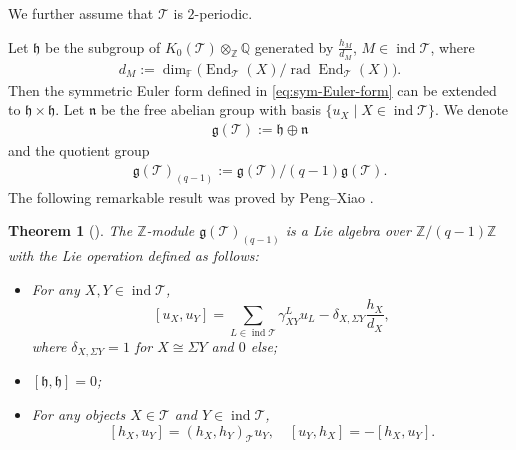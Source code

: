\documentclass[12pt,reqno]{amsart}
\numberwithin{equation}{section}
\newcommand{\rad}{\operatorname{rad}\nolimits}
\newcommand{\End}{\operatorname{End}\nolimits}
\renewcommand{\dim}{\operatorname{dim}\nolimits}
\newcommand{\go}{{K_0}}
\newtheorem{theorem}{Theorem}[section]
\begin{document}
	We further assume that $\mathcal{T}$ is $2$-periodic.
	
	
	Let $\mathfrak{h}$ be the subgroup of $\go(\mathcal{T})\otimes_{\mathbb{Z}}\mathbb{Q}$ generated by $\frac{h_M}{d_M}$, $M\in \operatorname{ind} \mathcal{T}$, where 
	\begin{align}
		d_M:=\dim_{\mathbb{F}}\big(\End_{\mathcal{T}}(X)/\rad \End_{\mathcal{T}} (X)\big).
	\end{align} 
	Then the symmetric Euler form defined in \eqref{eq:sym-Euler-form} can be extended to $\mathfrak{h}\times \mathfrak{h}$. Let $\mathfrak{n}$ be the free abelian group with basis $\{ u_X\mid X\in \operatorname{ind} \mathcal{T}\}$. We denote
	\begin{align}
		\mathfrak{g}(\mathcal{T}):=\mathfrak{h} \oplus \mathfrak{n}
	\end{align}
	and  the quotient group
	\begin{align}
		\mathfrak{g}(\mathcal{T})_{(q-1)}:=\mathfrak{g}(\mathcal{T}) /(q-1) \mathfrak{g}(\mathcal{T}).
	\end{align}
	The following remarkable result was proved by Peng--Xiao \cite{PX00-Tri-Cat-Kac}.
	\begin{theorem}[{\cite[Theorem 3.4]{PX00-Tri-Cat-Kac}}]
		The $\mathbb{Z}$-module $\mathfrak{g}(\mathcal{T})_{(q-1)}$ is a Lie algebra over $\mathbb{Z}/(q-1)\mathbb{Z}$ with the Lie operation defined as follows:
		\begin{itemize}
			\item[(1)] For any $X,Y\in\operatorname{ind} \mathcal{T}$,
			\[
			\left[u_{X}, u_{Y}\right]=\sum_{L \in \operatorname{ind} \mathcal{T}}\gamma_{XY}^L u_{L}-\delta_{X, \Sigma Y} \frac{h_{X}}{d_X},
			\]
			where $\delta_{X,\Sigma Y}=1$ for $X\cong \Sigma Y$ and $0$ else;
			\item[(2)] $[\mathfrak{h},\mathfrak{h}]=0$;
			\item[(3)] For any objects $X\in \mathcal{T}$ and $Y\in \operatorname{ind}\mathcal{T}$,
			\[
			[h_X,u_Y]=(h_X,h_Y)_{\mathcal{T}}u_Y,\quad [u_Y,h_X]=-[h_X,u_Y].
			\]
		\end{itemize}
	\end{theorem}
\end{document}
